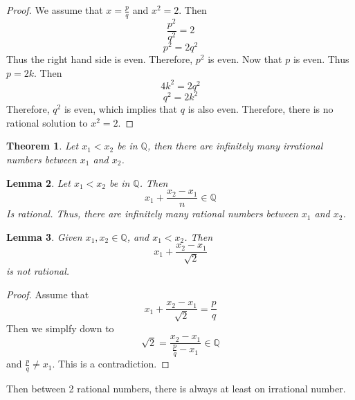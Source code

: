 \documentclass{article}
\newtheorem{theorem}{Theorem}[section]
\newtheorem{lemma}[theorem]{Lemma}
\newtheorem{one minute paper}[theorem]{One Minute Paper}
\begin{document}
\begin{proof}
    We assume that $x = \frac{p}{q}$ and $x^2 = 2$. Then 
    \begin{equation}
        \frac{p^2}{q^2} = 2
    \end{equation}
    \begin{equation}
        p^2 = 2q^2
    \end{equation}
    Thus the right hand side is even. Therefore, $p^2$ is even. Now that $p$ is even. Thus $p = 2k$. Then 
    \begin{equation}
        4k^2 = 2q^2
    \end{equation}
    \begin{equation}
        q^2 = 2k^2
    \end{equation}
    Therefore, $q^2$ is even, which implies that $q$ is also even. Therefore, there is no rational solution to $x^2 = 2$. 
\end{proof}

\begin{theorem}
    Let $x_1 < x_2$ be in $\mathbb{Q}$, then there are infinitely many irrational numbers between $x_1$ and $x_2$. 
\end{theorem}

\begin{lemma}
    Let $x_1 < x_2$ be in $\mathbb{Q}$. Then 
    \begin{equation}
        x_1 + \frac{x_2 - x_1}{n} \in \mathbb{Q}
    \end{equation}
    Is rational. Thus, there are infinitely many rational numbers between $x_1$ and $x_2$. 
\end{lemma}
\begin{lemma}
    Given $x_1, x_2 \in \mathbb{Q}$, and $x_1 < x_2$. Then
    \begin{equation}
        x_1 + \frac{x_2 - x_1}{\sqrt{2}}
    \end{equation}
    is not rational. 
\end{lemma}

\begin{proof}
    Assume that 
    \begin{equation}
        x_1 + \frac{x_2 - x_1}{\sqrt{2}} = \frac{p}{q}
    \end{equation}
    Then we simplfy down to 
    \begin{equation}
        \sqrt{2} = \frac{x_2 - x_1}{\frac{p}{q} - x_1} \in \mathbb{Q}
    \end{equation}
    and $\frac{p}{q} \neq x_1$. This is a contradiction. 
\end{proof}
Then between 2 rational numbers, there is always at least on irrational number. 
\end{document}
